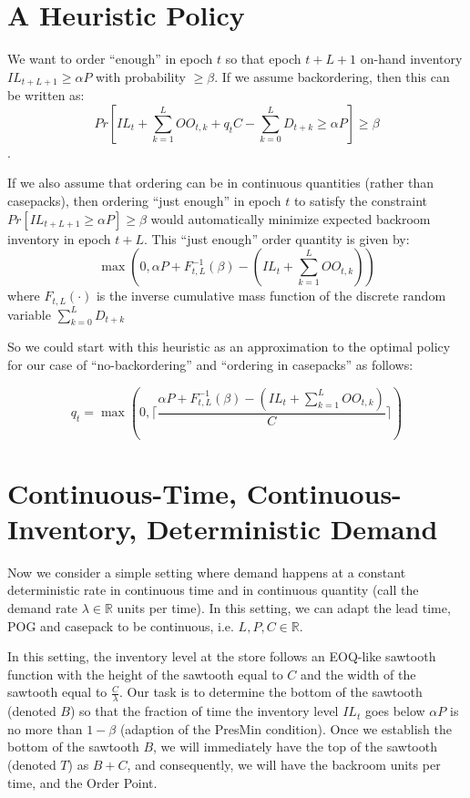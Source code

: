 \documentclass[12pt]{amsart}
\begin{document}
\section{A Heuristic Policy}
We want to order ``enough'' in epoch $t$ so that epoch $t+L+1$ on-hand inventory $IL_{t+L+1} \geq \alpha P$ with probability $\geq \beta$. If we assume backordering, then this can be written as:
$$Pr[IL_t + \sum_{k=1}^L OO_{t,k} + q_t C - \sum_{k=0}^L D_{t+k} \geq \alpha P] \geq \beta$$.

If we also assume that ordering can be in continuous quantities (rather than casepacks), then ordering ``just enough'' in epoch $t$ to satisfy the constraint $Pr[IL_{t+L+1} \geq \alpha P] \geq \beta$ would automatically minimize expected backroom inventory in epoch $t+L$. This ``just enough'' order quantity is given by:
$$\max(0, \alpha P + F_{t,L}^{-1}(\beta) - (IL_t + \sum_{k=1}^L OO_{t,k}))$$
where $F_{t,L}(\cdot)$ is the inverse cumulative mass function of the discrete random variable $\sum_{k=0}^L D_{t+k}$

So we could start with this heuristic as an approximation to the optimal policy for our case of ``no-backordering'' and ``ordering in casepacks'' as follows:

$$q_t = \max(0, \lceil \frac {\alpha P + F_{t,L}^{-1}(\beta) - (IL_t + \sum_{k=1}^L OO_{t,k})} C \rceil)$$

\section{Continuous-Time, Continuous-Inventory, Deterministic Demand}
Now we consider a simple setting where demand happens at a constant deterministic rate in continuous time and in continuous quantity (call the demand rate $\lambda \in \mathbb{R}$ units per time). In this setting, we can adapt the lead time, POG and casepack to be continuous, i.e. $L, P, C \in \mathbb{R}$. 

In this setting, the inventory level at the store follows an EOQ-like sawtooth function with the height of the sawtooth equal to $C$ and the width of the sawtooth equal to $\frac C \lambda$. Our task is to determine the bottom of the sawtooth (denoted $B$) so that the fraction of time the inventory level $IL_t$ goes below $\alpha P$ is no more than $1-\beta$ (adaption of the PresMin condition). Once we establish the bottom of the sawtooth $B$, we will immediately have the top of the sawtooth (denoted $T$) as $B + C$, and consequently, we will have the backroom units per time, and the Order Point.
\end{document}
